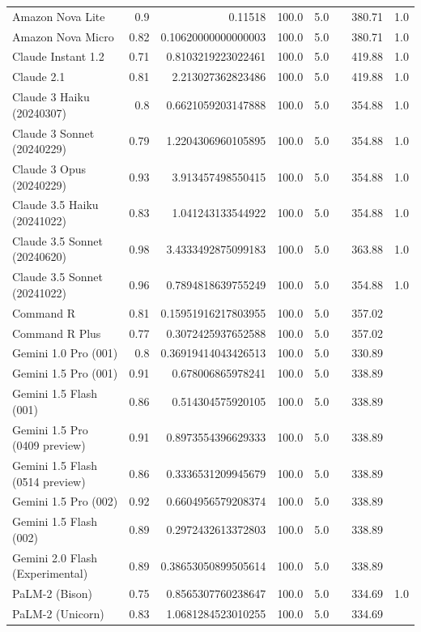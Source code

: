 \begin{table}[htp]
{\begin{tabular}{lrrrrrrr}
Amazon Nova Lite & 0.9 & 0.11518 & 100.0 & 5.0 &  & 380.71 & 1.0 \\
Amazon Nova Micro & 0.82 & 0.10620000000000003 & 100.0 & 5.0 &  & 380.71 & 1.0 \\
Claude Instant 1.2 & 0.71 & 0.8103219223022461 & 100.0 & 5.0 &  & 419.88 & 1.0 \\
Claude 2.1 & 0.81 & 2.213027362823486 & 100.0 & 5.0 &  & 419.88 & 1.0 \\
Claude 3 Haiku (20240307) & 0.8 & 0.6621059203147888 & 100.0 & 5.0 &  & 354.88 & 1.0 \\
Claude 3 Sonnet (20240229) & 0.79 & 1.2204306960105895 & 100.0 & 5.0 &  & 354.88 & 1.0 \\
Claude 3 Opus (20240229) & 0.93 & 3.913457498550415 & 100.0 & 5.0 &  & 354.88 & 1.0 \\
Claude 3.5 Haiku (20241022) & 0.83 & 1.041243133544922 & 100.0 & 5.0 &  & 354.88 & 1.0 \\
Claude 3.5 Sonnet (20240620) & 0.98 & 3.4333492875099183 & 100.0 & 5.0 &  & 363.88 & 1.0 \\
Claude 3.5 Sonnet (20241022) & 0.96 & 0.7894818639755249 & 100.0 & 5.0 &  & 354.88 & 1.0 \\
Command R & 0.81 & 0.15951916217803955 & 100.0 & 5.0 &  & 357.02 &  \\
Command R Plus & 0.77 & 0.3072425937652588 & 100.0 & 5.0 &  & 357.02 &  \\
Gemini 1.0 Pro (001) & 0.8 & 0.36919414043426513 & 100.0 & 5.0 &  & 330.89 &  \\
Gemini 1.5 Pro (001) & 0.91 & 0.678006865978241 & 100.0 & 5.0 &  & 338.89 &  \\
Gemini 1.5 Flash (001) & 0.86 & 0.514304575920105 & 100.0 & 5.0 &  & 338.89 &  \\
Gemini 1.5 Pro (0409 preview) & 0.91 & 0.8973554396629333 & 100.0 & 5.0 &  & 338.89 &  \\
Gemini 1.5 Flash (0514 preview) & 0.86 & 0.3336531209945679 & 100.0 & 5.0 &  & 338.89 &  \\
Gemini 1.5 Pro (002) & 0.92 & 0.6604956579208374 & 100.0 & 5.0 &  & 338.89 &  \\
Gemini 1.5 Flash (002) & 0.89 & 0.2972432613372803 & 100.0 & 5.0 &  & 338.89 &  \\
Gemini 2.0 Flash (Experimental) & 0.89 & 0.38653050899505614 & 100.0 & 5.0 &  & 338.89 &  \\
PaLM-2 (Bison) & 0.75 & 0.8565307760238647 & 100.0 & 5.0 &  & 334.69 & 1.0 \\
PaLM-2 (Unicorn) & 0.83 & 1.0681284523010255 & 100.0 & 5.0 &  & 334.69 &  \\

\end{tabular}}
\end{table}
